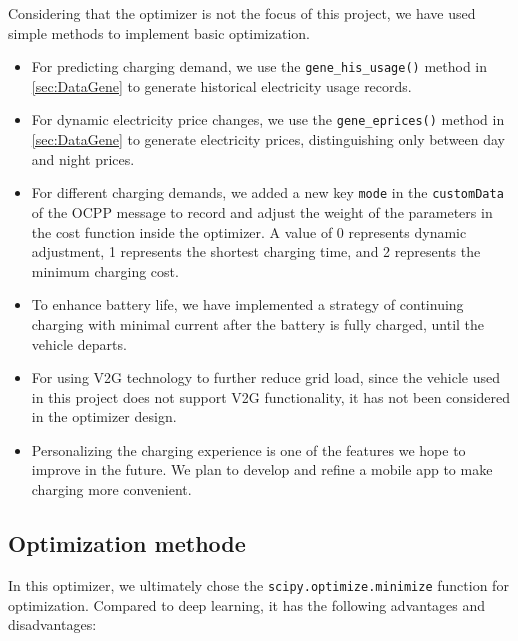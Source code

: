 \documentclass[
english,
ruledheaders=section,%
class=report,%
thesis={type=Report},%
accentcolor=9c,%
custommargins=true,%
marginpar=false,%
parskip=half-,%
fontsize=11pt,%
logofile={img/tuda_logo.pdf}, %
]{tudapub}
\begin{document}
    Considering that the optimizer is not the focus of this project, we have used simple methods to implement basic optimization.

    \begin{itemize}
        \item For predicting charging demand, we use the \texttt{gene\_his\_usage()} method in \autoref{sec:DataGene} to generate historical electricity usage records.
        \item For dynamic electricity price changes, we use the \texttt{gene\_eprices()} method in \autoref{sec:DataGene} to generate electricity prices, distinguishing only between day and night prices.
        \item For different charging demands, we added a new key \texttt{mode} in the \texttt{customData} of the OCPP message to record and adjust the weight of the parameters in the cost function inside the optimizer. A value of 0 represents dynamic adjustment, 1 represents the shortest charging time, and 2 represents the minimum charging cost.
        \item To enhance battery life, we have implemented a strategy of continuing charging with minimal current after the battery is fully charged, until the vehicle departs.
        \item For using V2G technology to further reduce grid load, since the vehicle used in this project does not support V2G functionality, it has not been considered in the optimizer design.
        \item Personalizing the charging experience is one of the features we hope to improve in the future. We plan to develop and refine a mobile app to make charging more convenient.
    \end{itemize}


    \subsection{Optimization methode}
    \label{subsec: Optimization methode}

    In this optimizer, we ultimately chose the \texttt{scipy.optimize.minimize} function for optimization. Compared to deep learning, it has the following advantages and disadvantages:
\end{document}
